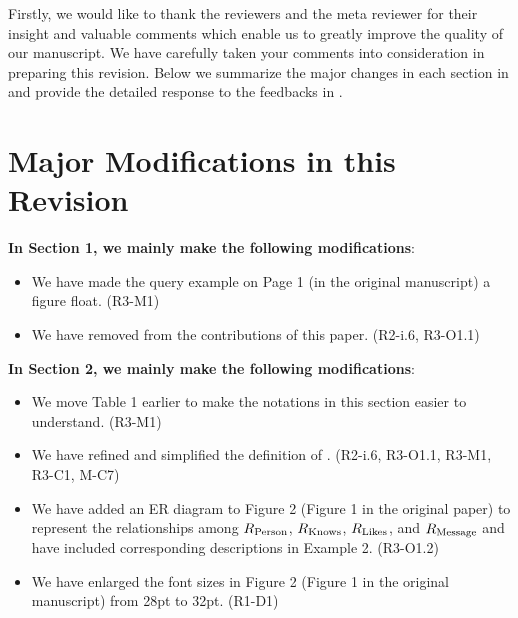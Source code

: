 Firstly, we would like to thank the reviewers and the meta reviewer for their insight and valuable comments which enable us to greatly improve the quality of our manuscript. We have carefully taken your comments into consideration in preparing this revision.
Below we summarize the major changes in each section in  and provide the detailed response to the feedbacks in .


\section{Major Modifications in this Revision}
\label{sec:modifications}

\textbf{In Section 1, we mainly make the following modifications}:
\begin{itemize}
	\item We have made the query example on Page 1 (in the original manuscript) a figure float. (R3-M1)
	\item We have removed \rgmapping from the contributions of this paper. (R2-i.6, R3-O1.1)
\end{itemize}

\textbf{In Section 2, we mainly make the following modifications}:
\begin{itemize}
	\item We move Table 1 earlier to make the notations in this section easier to understand. (R3-M1)
	\item We have refined and simplified the definition of \rgmapping. (R2-i.6, R3-O1.1, R3-M1, R3-C1, M-C7)
	\item We have added an ER diagram to Figure 2 (Figure 1 in the original paper) to represent the relationships among ${R_{\text{Person}}}$,  ${R_{\text{Knows}}}$, ${R_{\text{Likes}}}$, and ${R_{\text{Message}}}$ and have included corresponding descriptions in Example 2. (R3-O1.2)
	\item We have enlarged the font sizes in Figure 2 (Figure 1 in the original manuscript) from 28pt to 32pt. (R1-D1)
\end{itemize}

